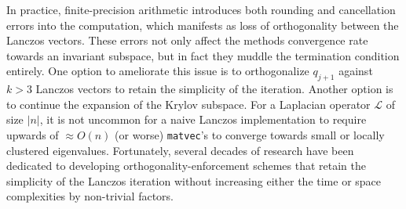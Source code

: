 \documentclass[10pt]{article}
\numberwithin{equation}{section}
\newcommand{\+}{%
	\raisebox{0.18ex}{\scaleobj{0.55}{+}}
}
\theoremstyle{definition}
\theoremstyle{definition}
\begin{document}
In practice, finite-precision arithmetic introduces both rounding and cancellation errors into the computation, which manifests as loss of orthogonality between the Lanczos vectors. These errors not only affect the methods convergence rate towards an invariant subspace, but in fact they muddle the termination condition entirely. 
One option to ameliorate this issue is to orthogonalize $q_{j+1}$ against $k > 3$ Lanczos vectors to  retain the simplicity of the iteration. Another option is to continue the expansion of the Krylov subspace. 
For a Laplacian operator $\mathcal{L}$ of size $\lvert n \rvert$, it is not uncommon for a naive Lanczos implementation to require upwards of $\approx O(n)$ (or worse) \texttt{matvec}'s to converge towards small or locally clustered eigenvalues.
Fortunately, several decades of research have been dedicated to developing orthogonality-enforcement schemes that retain the simplicity of the Lanczos iteration without increasing either the time or space complexities by non-trivial factors. 

\end{document}
